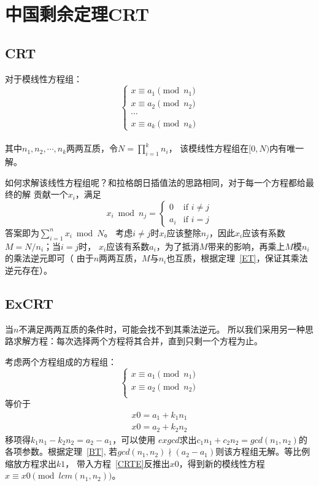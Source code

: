 \section{中国剩余定理CRT}
\subsection{CRT}
\begin{theorem}
	对于模线性方程组：
	\begin{displaymath}
		\left\{\begin{array}{l}
			x \equiv a_1 \pmod{n_1} \\
			x \equiv a_2 \pmod{n_2} \\
			\cdots                  \\
			x \equiv a_k \pmod{n_k}
		\end{array}\right.
	\end{displaymath}\\
	其中$n_1,n_2,\cdots,n_k$两两互质，令$\displaystyle N=\prod_{i=1}^k{n_i}$，
	该模线性方程组在$[0,N)$内有唯一解。
\end{theorem}
如何求解该线性方程组呢？和拉格朗日插值法的思路相同，对于每一个方程都给最终的解
贡献一个$x_i$，满足
\begin{displaymath}
	x_i \bmod n_j =
	\left\{\begin{array}{ll}
		0   & \textrm{if $i\neq j$} \\
		a_i & \textrm{if $i=j$}
	\end{array}\right.
\end{displaymath}
答案即为$\displaystyle \sum_{i=1}^n{x_i} \bmod N$。
考虑$i\neq j$时$x_i$应该整除$n_j$，因此$x_i$应该有系数$M=N/n_i$；当$i=j$时，
$x_i$应该有系数$a_i$，为了抵消$M$带来的影响，再乘上$M$模$n_i$的乘法逆元即可（
由于$n$两两互质，$M$与$n_i$也互质，根据定理~\ref{ET}，保证其乘法逆元存在）。
\subsection{ExCRT}
当$n$不满足两两互质的条件时，可能会找不到其乘法逆元。
所以我们采用另一种思路求解方程：每次选择两个方程将其合并，直到只剩一个方程为止。

考虑两个方程组成的方程组：
\begin{displaymath}
	\left\{\begin{array}{l}
		x \equiv a_1 \pmod{n_1} \\
		x \equiv a_2 \pmod{n_2} \\
	\end{array}\right.
\end{displaymath}
等价于
\begin{eqnarray}
	x0=a_1+k_1n_1\label{CRTE}\\
	x0=a_2+k_2n_2
\end{eqnarray}
移项得$k_1n_1-k_2n_2=a_2-a_1$，可以使用
$exgcd$求出$c_1n_1+c_2n_2=gcd(n_1,n_2)$的各项参数。根据定理~\ref{BT},
若$gcd(n_1,n_2)\nmid(a_2-a_1)$则该方程组无解。等比例缩放方程求出$k1$，
带入方程~\ref{CRTE}反推出$x0$，得到新的模线性方程$x \equiv x0
	\pmod{lcm(n_1,n_2)}$。
